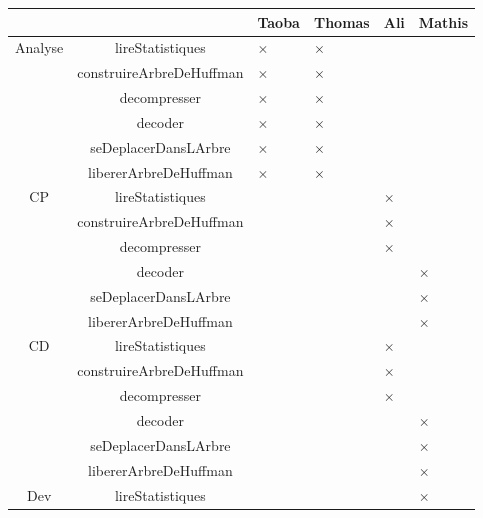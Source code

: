  
 \begin{table}[ht]
    \centering
    \begin{tabular}{|c|c|>{\centering\arraybackslash}p{1.5cm}|>{\centering\arraybackslash}p{1.5cm}|>{\centering\arraybackslash}p{1.5cm}|>{\centering\arraybackslash}p{1.5cm}|}
        \cline{3-6}
        \multicolumn{2}{c|}{} & Taoba & Thomas & Ali & Mathis \\
        \hline
        \multirow{6}{*}{Analyse}
        & lireStatistiques & $\times$ & $\times$ & & \\
        \cline{2-6}
        & construireArbreDeHuffman & $\times$ & $\times$ & & \\
        \cline{2-6}
        & decompresser & $\times$ & $\times$ & & \\ 
        \cline{2-6}
        & decoder & $\times$ & $\times$ & & \\
        \cline{2-6}
        & seDeplacerDansLArbre & $\times$ & $\times$ & & \\
        \cline{2-6}
        & libererArbreDeHuffman & $\times$ & $\times$ & &\\
        \hline
         \multirow{6}{*}{CP}
        & lireStatistiques & & & $\times$ & \\
        \cline{2-6}
        & construireArbreDeHuffman & & & $\times$ & \\
        \cline{2-6}
        & decompresser &  & & $\times$ & \\ 
        \cline{2-6}
        & decoder & & & & $\times$ \\
        \cline{2-6}
        & seDeplacerDansLArbre & & & & $\times$ \\
        \cline{2-6}
        & libererArbreDeHuffman & & & & $\times$ \\
        \hline
        \multirow{6}{*}{CD}
        & lireStatistiques & & & $\times$ & \\
        \cline{2-6}
        & construireArbreDeHuffman & & & $\times$ & \\
        \cline{2-6}
        & decompresser & & & $\times$ & \\ 
        \cline{2-6}
        & decoder & & & & $\times$ \\
        \cline{2-6}
        & seDeplacerDansLArbre & & & & $\times$ \\
        \cline{2-6}
        & libererArbreDeHuffman & & & & $\times$ \\
        \hline
       \multirow{6}{*}{Dev}
        & lireStatistiques & & & & $\times$ \\

\end{tabular}
\end{table}
